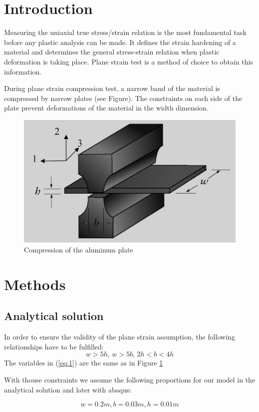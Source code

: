 \documentclass[12pt]{article}
\begin{document}
\tableofcontents
\pagebreak
\section{Introduction}
Measuring the uniaxial true stress/strain relation is the most fundamental task before any plastic
analysis can be made. It defines the strain hardening of a material and determines the general
stress-strain relation when plastic deformation is taking place. Plane strain test is a method of
choice to obtain this information.

During plane strain compression test, a narrow band of the material is compressed by narrow
plates (see Figure). The constraints on each side of the plate prevent deformations of the
material in the width dimension.

\begin{figure}[!htb]
  \centering
  \includegraphics[width=0.6\linewidth]{pics/shematics}
  \caption{Compression of the aluminum plate}
  \label{fig:1}
\end{figure}
\newpage
\section{Methods}

\subsection{Analytical solution}
In order to ensure the validity of the plane strain assumption, the following relationships have to
be fulfilled:
\begin{equation}\label{eq:1}
  w > 5h, \, w > 5b,\, 2h < b < 4h
\end{equation}
The variables in (\ref{eq:1}) are the same as in Figure \ref{fig:1}

With thouse constraints we assume the following proportions for our model in the analytical solution and later with abaqus:

\begin{equation}\label{eq:2}
  w = 0.2m, b = 0.03m, h = 0.01m
\end{equation}
\end{document}
